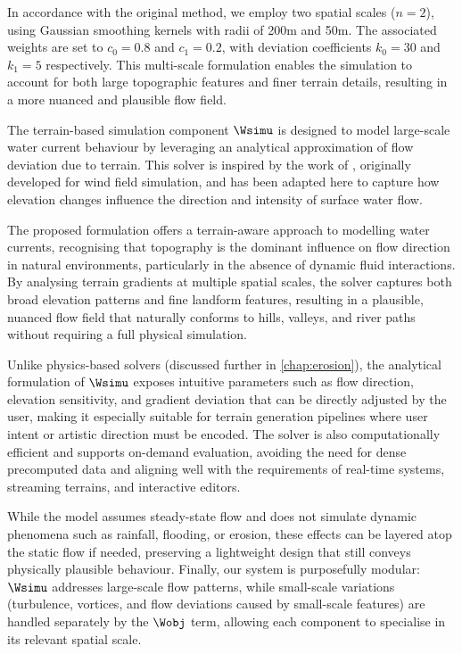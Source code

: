 In accordance with the original method, we employ two spatial scales ($n = 2$), using Gaussian smoothing kernels with radii of 200m and 50m. The associated weights are set to $c_0 = 0.8$ and $c_1 = 0.2$, with deviation coefficients $k_0 = 30$ and $k_1 = 5$ respectively. This multi-scale formulation enables the simulation to account for both large topographic features and finer terrain details, resulting in a more nuanced and plausible flow field.

The terrain-based simulation component $\Wsimu$ is designed to model large-scale water current behaviour by leveraging an analytical approximation of flow deviation due to terrain. This solver is inspired by the work of \cite{Paris2019b}, originally developed for wind field simulation, and has been adapted here to capture how elevation changes influence the direction and intensity of surface water flow.

The proposed formulation offers a terrain-aware approach to modelling water currents, recognising that topography is the dominant influence on flow direction in natural environments, particularly in the absence of dynamic fluid interactions. By analysing terrain gradients at multiple spatial scales, the solver captures both broad elevation patterns and fine landform features, resulting in a plausible, nuanced flow field that naturally conforms to hills, valleys, and river paths without requiring a full physical simulation.

Unlike physics-based solvers (discussed further in \cref{chap:erosion}), the analytical formulation of $\Wsimu$ exposes intuitive parameters such as flow direction, elevation sensitivity, and gradient deviation that can be directly adjusted by the user, making it especially suitable for terrain generation pipelines where user intent or artistic direction must be encoded. The solver is also computationally efficient and supports on-demand evaluation, avoiding the need for dense precomputed data and aligning well with the requirements of real-time systems, streaming terrains, and interactive editors.

While the model assumes steady-state flow and does not simulate dynamic phenomena such as rainfall, flooding, or erosion, these effects can be layered atop the static flow if needed, preserving a lightweight design that still conveys physically plausible behaviour. Finally, our system is purposefully modular: $\Wsimu$ addresses large-scale flow patterns, while small-scale variations (turbulence, vortices, and flow deviations caused by small-scale features) are handled separately by the $\Wobj$ term, allowing each component to specialise in its relevant spatial scale.

